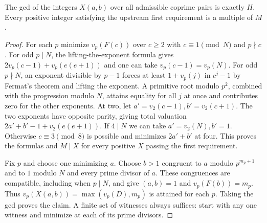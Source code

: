 \begin{theorem}\label{th:gcd}
The gcd of the integers $X(a,b)$ over all admissible coprime pairs is exactly
$H$. Every positive integer satisfying the upstream first requirement is a
multiple of $M$.
\end{theorem}
\begin{proof}
For each $p$ minimize $v_p(F(c))$ over $c\ge2$ with $c\equiv1\pmod N$
and $p\nmid c$. For odd $p\mid N$, the lifting-the-exponent formula gives
$2v_p(c-1)+v_p(e(e+1))$ and one can take $v_p(c-1)=v_p(N)$.
For odd $p\nmid N$, an exponent divisible by $p-1$ forces at least
$1+v_p(j)$ in $c^j-1$ by Fermat's theorem and lifting the exponent.
A primitive root modulo $p^2$, combined with the progression modulo $N$,
attains equality for all $j$ at once and contributes zero for the other
exponents. At two, let $a'=v_2(c-1), b'=v_2(c+1)$. The two exponents have
opposite parity, giving total valuation
$2a'+b'-1+v_2(e(e+1))$. If $4\mid N$ we can take
$a'=v_2(N), b'=1$. Otherwise $c\equiv3\pmod8$ is possible and minimizes
$2a'+b'$ at four. This proves the formulas and $M\mid X$ for every
positive $X$ passing the first requirement.

Fix $p$ and choose one minimizing $a$. Choose $b>1$ congruent to $a$ modulo
$p^{m_p+1}$ and to $1$ modulo $N$ and every prime divisor of $a$. These
congruences are compatible, including when $p\mid N$, and give
$(a,b)=1$ and $v_p(F(b))=m_p$. Thus
$v_p(X(a,b))=\max(v_p(D),m_p)$ is attained for each $p$.
Taking the gcd proves the claim. A finite set of witnesses always suffices:
start with any one witness and minimize at each of its prime divisors.
\end{proof}

